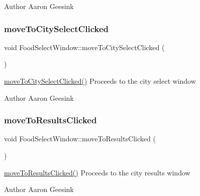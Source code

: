 \begin{DoxyAuthor}{Author}
Aaron Geesink 
\end{DoxyAuthor}
\mbox{\label{class_food_select_window_a0d2bb2f7e07f62e62c2920d989415d8c}} 
\subsubsection{\texorpdfstring{moveToCitySelectClicked}{moveToCitySelectClicked}}
{\footnotesize\ttfamily void Food\+Select\+Window\+::move\+To\+City\+Select\+Clicked (\begin{DoxyParamCaption}{ }\end{DoxyParamCaption})\hspace{0.3cm}{\ttfamily [signal]}}



\mbox{\hyperlink{class_food_select_window_a0d2bb2f7e07f62e62c2920d989415d8c}{move\+To\+City\+Select\+Clicked()}} Proceeds to the city select window 

\begin{DoxyAuthor}{Author}
Aaron Geesink 
\end{DoxyAuthor}
\mbox{\label{class_food_select_window_a76b0dfec8f72dfa4c336732a922287fc}} 
\subsubsection{\texorpdfstring{moveToResultsClicked}{moveToResultsClicked}}
{\footnotesize\ttfamily void Food\+Select\+Window\+::move\+To\+Results\+Clicked (\begin{DoxyParamCaption}{ }\end{DoxyParamCaption})\hspace{0.3cm}{\ttfamily [signal]}}



\mbox{\hyperlink{class_food_select_window_a76b0dfec8f72dfa4c336732a922287fc}{move\+To\+Results\+Clicked()}} Proceeds to the city results window 

\begin{DoxyAuthor}{Author}
Aaron Geesink 
\end{DoxyAuthor}
\mbox{\label{class_food_select_window_a6df884d5b39d16a2708f8bcae205ecd5}} 
